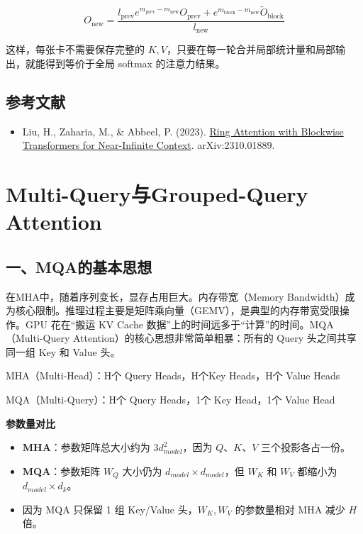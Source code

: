 \[
O_{\mathrm{new}} =
\frac{
l_{\mathrm{prev}} e^{m_{\mathrm{prev}} - m_{\mathrm{new}}} O_{\mathrm{prev}}
+ e^{m_{\mathrm{block}} - m_{\mathrm{new}}} \tilde O_{\mathrm{block}}
}{
l_{\mathrm{new}}
}
\]

这样，每张卡不需要保存完整的 \(K, V\)，只要在每一轮合并局部统计量和局部输出，就能得到等价于全局 softmax 的注意力结果。

\hypertarget{ux53c2ux8003ux6587ux732e-93}{%
\subsection{参考文献}\label{ux53c2ux8003ux6587ux732e-93}}

\vspace{0.25em}
\begin{itemize}
\tightlist
\item
  Liu, H., Zaharia, M., \& Abbeel, P. (2023). \href{https://arxiv.org/abs/2310.01889}{Ring Attention with Blockwise Transformers for Near-Infinite Context}. arXiv:2310.01889.
\end{itemize}

\clearpage

\hypertarget{multi-queryux4e0egrouped-query-attention}{%
\section{Multi-Query与Grouped-Query Attention}\label{multi-queryux4e0egrouped-query-attention}}

\hypertarget{ux4e00mqaux7684ux57faux672cux601dux60f3}{%
\subsection{一、MQA的基本思想}\label{ux4e00mqaux7684ux57faux672cux601dux60f3}}

在MHA中，随着序列变长，显存占用巨大。内存带宽（Memory Bandwidth）成为核心限制。推理过程主要是矩阵乘向量（GEMV），是典型的内存带宽受限操作。GPU 花在``搬运 KV Cache 数据''上的时间远多于``计算''的时间。MQA（Multi-Query Attention）的核心思想非常简单粗暴：所有的 Query 头之间共享同一组 Key 和 Value 头。

MHA（Multi-Head）：H个 Query Heads，H个Key Heads，H个 Value Heads

MQA（Multi-Query）：H个 Query Heads，1个 Key Head，1个 Value Head

\textbf{参数量对比}

\begin{itemize}
\tightlist
\item
  \textbf{MHA}：参数矩阵总大小约为 \(3d_{model}^2\)，因为 \(Q\)、\(K\)、\(V\) 三个投影各占一份。
\item
  \textbf{MQA}：参数矩阵 \(W_Q\) 大小仍为 \(d_{model} \times d_{model}\)，但 \(W_K\) 和 \(W_V\) 都缩小为 \(d_{model} \times d_k\)。
\item
  因为 MQA 只保留 1 组 Key/Value 头，\(W_K,W_V\) 的参数量相对 MHA 减少 \(H\) 倍。
\end{itemize}

